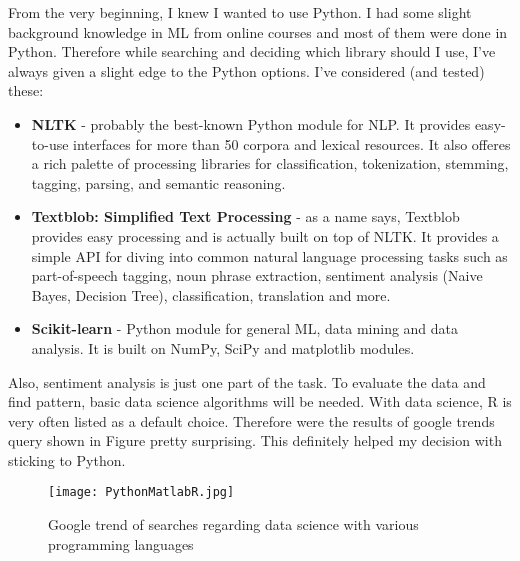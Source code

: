 From the very beginning, I knew I wanted to use Python. I had some slight background knowledge in ML from online courses and most of them were done in Python. Therefore while searching and deciding which library should I use, I've always given a slight edge to the Python options. I've considered (and tested) these:
\begin{itemize}
\item \textbf{NLTK} - probably the best-known Python module for NLP. It provides easy-to-use interfaces for more than 50 corpora and lexical resources. It also offeres a rich palette of processing libraries for classification, tokenization, stemming, tagging, parsing, and semantic reasoning.
\item \textbf{Textblob: Simplified Text Processing} - as a name says, Textblob provides easy processing and is actually built on top of NLTK. It provides a simple API for diving into common natural language processing tasks such as part-of-speech tagging, noun phrase extraction, sentiment analysis (Naive Bayes, Decision Tree), classification, translation and more.
\item \textbf{Scikit-learn} - Python module for general ML, data mining and data analysis. It is built on NumPy, SciPy and matplotlib modules.
\end{itemize}

Also, sentiment analysis is just one part of the task. To evaluate the data and find pattern, basic data science algorithms will be needed. With data science, R is very often listed as a default choice. Therefore were the results of google trends query shown in Figure  pretty surprising. This definitely helped my decision with sticking to Python.

\begin{figure}[H]%
    \centering
	\texttt{[image: PythonMatlabR.jpg]}
    \caption{Google trend of searches regarding data science with various programming languages}%
    \label{fig:PythonMatlabR}%
\end{figure}
